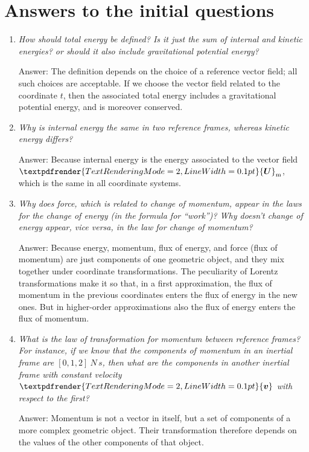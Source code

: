 \documentclass[\ifafour a4paper,12pt,\else a5paper,10pt,\fi%
onecolumn,oneside,article,%
british%
]{memoir}
\renewcommand*{\bm}[1]{\textpdfrender{TextRenderingMode=2,LineWidth=0.1pt}{\boldsymbol{#1}}}
\renewcommand*{\|}[1][]{\nonscript\:#1\vert\nonscript\:\mathopen{}}
\newcommand*{\yU}{\bm{U}}
\newcommand*{\yUm}{\yU_{\textrm{m}}}
\begin{document}
\section{Answers to the initial questions}
\label{sec:answers}

\begin{enumerate}[itemsep=1ex]
\item \emph{How should \emph{total energy} be defined? Is it just the sum of internal and kinetic energies? or should it also include gravitational potential energy?}

  Answer: The definition depends on the choice of a reference vector field; all such choices are acceptable. If we choose the vector field related to the coordinate $t$, then the associated total energy includes a gravitational potential energy, and is moreover conserved.


\item \emph{Why is \emph{internal energy} the same in two reference frames, whereas \emph{kinetic energy} differs?}

Answer: Because internal energy is the energy associated to the vector field $\yUm$, which is  the same in all coordinate systems.


\item \emph{Why does force, which is related to change of momentum, appear in the laws for the change of energy (in the formula for \enquote{work})? Why doesn't change of energy appear, vice versa, in the law for change of momentum?}

  Answer: Because energy, momentum, flux of energy, and force (flux of momentum) are just components of one geometric object, and they mix together under coordinate transformations. The peculiarity of Lorentz transformations make it so that, in a first approximation, the flux of momentum in the previous coordinates enters the flux of energy in the new ones. But in higher-order approximations also the flux of energy enters the flux of momentum.


\item \emph{What is the \emph{law of transformation for momentum} between reference frames? For instance, if we know that the components of momentum in an inertial frame are $[0,1,2]\:\unit{N\,s}$, then what are the components in another inertial frame with constant velocity $\bm{v}$ with respect to the first?}

Answer: Momentum is not a vector in itself, but a set of components of a more complex geometric object. Their transformation therefore depends on the values of the other components of that object.
\end{enumerate}
\end{document}
